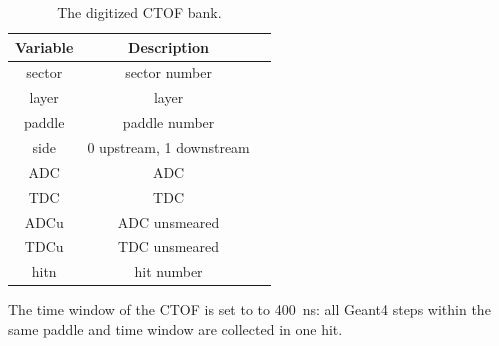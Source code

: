 \begin{table}[h]
	\begin{center}
		\begin{tabular}{| c | c | c |}
			\hline \hline
			Variable         & Description   \\
			\hline
              sector  &                             sector number   \\
               layer  &                                     layer   \\
              paddle  &                             paddle number   \\
                side  &                  0 upstream, 1 downstream   \\
                 ADC  &                                       ADC   \\
                 TDC  &                                       TDC   \\
                ADCu  &                             ADC unsmeared   \\
                TDCu  &                             TDC unsmeared   \\
                hitn  &                                hit number   \\
			\hline \hline
		\end{tabular}
	\end{center}
	\caption{The digitized CTOF bank.}\label{tab:ctofBank}
\end{table}

The time window of the CTOF is set to to 400~ns: all Geant4 steps within the same paddle and time window are
collected in one hit.
